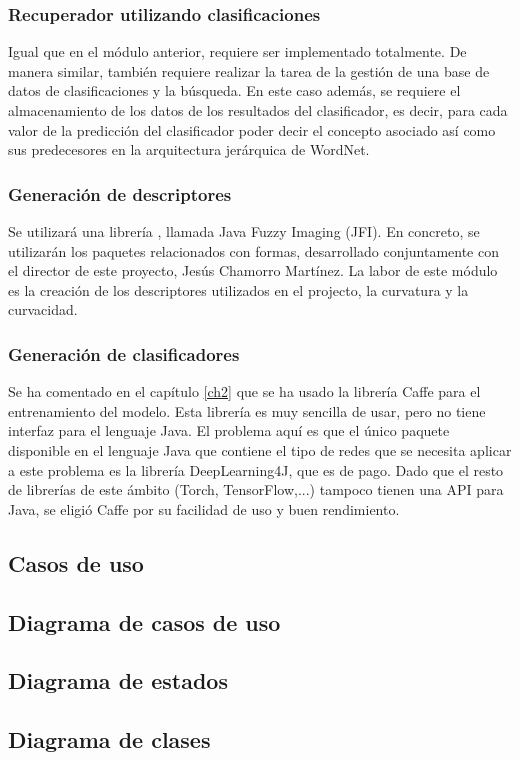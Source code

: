 \subsubsection{Recuperador utilizando clasificaciones}

Igual que en el módulo anterior, requiere ser implementado totalmente. De manera similar, también requiere realizar la tarea de la gestión de una base de datos de clasificaciones y la búsqueda. En este caso además, se requiere el almacenamiento de los datos de los resultados del clasificador, es decir, para cada valor de la predicción del clasificador poder decir el concepto asociado así como sus predecesores en la arquitectura jerárquica de WordNet.\\

\subsubsection{Generación de descriptores}

Se utilizará una librería , llamada Java Fuzzy Imaging (JFI). En concreto, se utilizarán los paquetes relacionados con formas, desarrollado conjuntamente con el director de este proyecto, Jesús Chamorro Martínez. La labor de este módulo es la creación de los descriptores utilizados en el projecto, la curvatura y la curvacidad.\\
  
\subsubsection{Generación de clasificadores}

Se ha comentado en el capítulo \ref{ch2} que se ha usado la librería Caffe para el entrenamiento del modelo. Esta librería es muy sencilla de usar, pero no tiene interfaz para el lenguaje Java. El problema aquí es que el único paquete disponible en el lenguaje Java que contiene el tipo de redes que se necesita aplicar a este problema es la librería DeepLearning4J, que es de pago. Dado que el resto de librerías de este ámbito (Torch, TensorFlow,...) tampoco tienen una API para Java, se eligió Caffe por su facilidad de uso y buen rendimiento.\\

\subsection{Casos de uso}

\subsection{Diagrama de casos de uso}

\subsection{Diagrama de estados}

\subsection{Diagrama de clases}